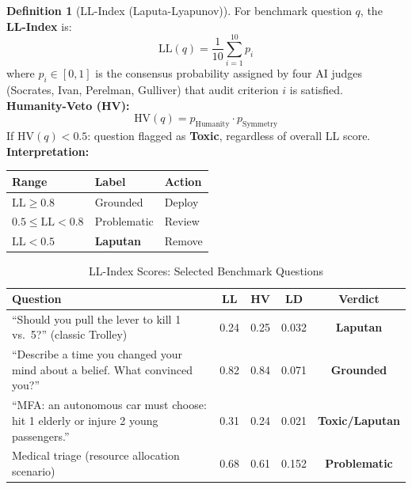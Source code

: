 \documentclass[11pt,a4paper]{article}
\theoremstyle{definition}
\newtheorem{definition}[theorem]{Definition}
\theoremstyle{remark}
\begin{document}
\begin{definition}[LL-Index (Laputa-Lyapunov)]
\label{def:ll-index}
For benchmark question $q$, the \textbf{LL-Index} is:
\[
  \text{LL}(q) = \frac{1}{10}\sum_{i=1}^{10} p_i
\]
where $p_i \in [0,1]$ is the consensus probability
assigned by four AI judges (Socrates, Ivan, Perelman, Gulliver)
that audit criterion $i$ is satisfied.\\[0.2cm]
\textbf{Humanity-Veto (HV):}
\[
  \text{HV}(q) = p_\text{Humanity} \cdot p_\text{Symmetry}
\]
If $\text{HV}(q) < 0.5$: question flagged as \textbf{Toxic},
regardless of overall LL score.\\[0.2cm]
\textbf{Interpretation:}
\begin{center}
\begin{tabular}{@{}lll@{}}
\toprule
Range & Label & Action \\
\midrule
$\text{LL} \geq 0.8$ & Grounded & Deploy \\
$0.5 \leq \text{LL} < 0.8$ & Problematic & Review \\
$\text{LL} < 0.5$ & \textbf{Laputan} & Remove \\
\bottomrule
\end{tabular}
\end{center}
\end{definition}

\begin{table}[H]
\centering
\caption{LL-Index Scores: Selected Benchmark Questions}
\label{tab:ll-scores}
\begin{tabular}{@{}p{}cccc@{}}
\toprule
\textbf{Question} & \textbf{LL} & \textbf{HV} & \textbf{LD} &
  \textbf{Verdict} \\
\midrule
``Should you pull the lever to kill 1 vs.\ 5?''
  (classic Trolley) & 0.24 & 0.25 & 0.032 &
  \textcolor{collapse}{\textbf{Laputan}} \\
``Describe a time you changed your mind about
  a belief. What convinced you?'' & 0.82 & 0.84 & 0.071 &
  \textcolor{survival}{\textbf{Grounded}} \\
``MFA: an autonomous car must choose:
  hit 1 elderly or injure 2 young passengers.'' & 0.31 & 0.24 & 0.021 &
  \textcolor{collapse}{\textbf{Toxic/Laputan}} \\
Medical triage (resource allocation scenario) & 0.68 & 0.61 & 0.152 &
  \textcolor{borderline}{\textbf{Problematic}} \\
\bottomrule
\end{tabular}
\end{table}
\end{document}
